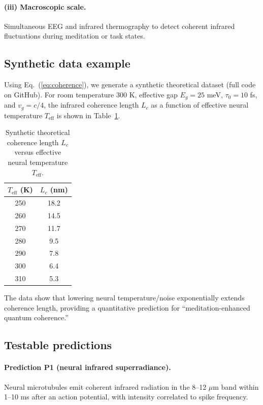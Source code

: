 \documentclass[11pt,a4paper]{article}
\begin{document}
\paragraph{(iii) Macroscopic scale.} Simultaneous EEG and infrared thermography to detect coherent infrared fluctuations during meditation or task states.

\subsection{Synthetic data example}

Using Eq.~(\ref{eq:coherence}), we generate a synthetic theoretical dataset (full code on GitHub). For room temperature 300 K, effective gap $E_g = 25$ meV, $\tau_0 = 10$ fs, and $v_g = c/4$, the infrared coherence length $L_c$ as a function of effective neural temperature $T_{\text{eff}}$ is shown in Table~\ref{tab:coherence}.

\begin{table}[htbp]
\centering
\caption{Synthetic theoretical coherence length $L_c$ versus effective neural temperature $T_{\text{eff}}$.}
\label{tab:coherence}
\begin{tabular}{@{}cc@{}}
\toprule
$T_{\text{eff}}$ (K) & $L_c$ (nm) \\ \midrule
250 & 18.2 \\
260 & 14.5 \\
270 & 11.7 \\
280 & 9.5  \\
290 & 7.8  \\
300 & 6.4  \\
310 & 5.3  \\ \bottomrule
\end{tabular}
\end{table}

The data show that lowering neural temperature/noise exponentially extends coherence length, providing a quantitative prediction for ``meditation-enhanced quantum coherence.''

\subsection{Testable predictions}

\paragraph{Prediction P1 (neural infrared superradiance).} Neural microtubules emit coherent infrared radiation in the 8--12 $\mu$m band within 1--10 ms after an action potential, with intensity correlated to spike frequency.
\end{document}
